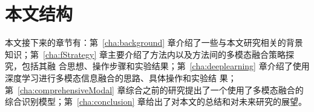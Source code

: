 \section{本文结构}
\label{sec:thesisstructure}

本文接下来的章节有：第~\ref{cha:background} 章介绍了一些与本文研究相关的背景知识；第~\ref{cha:fStrategy} 章主要介绍了方法内以及方法间的多模态融合策略探究，包括其融
合思想、操作步骤和实验结果；第~\ref{cha:deeplearning} 章介绍了使用深度学习进行多模态信息融合的思路、具体操作和实验结
果；第~\ref{cha:comprehensiveModal} 章综合之前的研究提出了一个使用了多模态融合的综合识别模型；第~\ref{cha:conclusion} 章给出了对本文的总结和对未来研究的展望。